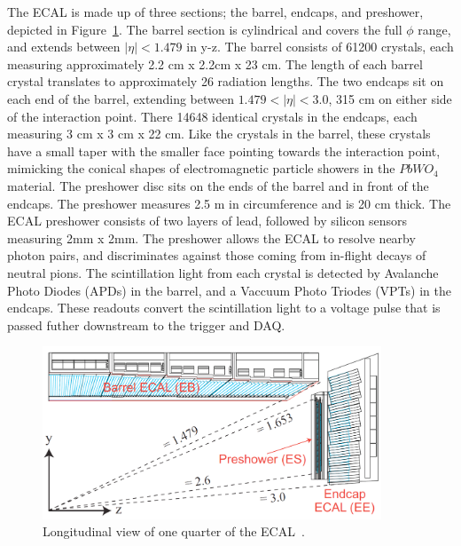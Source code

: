 The ECAL is made up of three sections; the barrel, endcaps, and preshower, depicted in Figure~\ref{fig:cms_ecal}. The barrel section is cylindrical and covers the full $\phi$
range, and extends between $|\eta| < 1.479$ in y-z. The barrel consists of 61200 crystals, each measuring approximately 2.2 cm x 2.2cm x 23 cm. The length of each barrel
crystal translates to approximately 26 radiation lengths. The two endcaps sit on each end of the barrel, extending between $1.479 < |\eta|< 3.0$, 315 cm on either side of
the interaction point. There 14648 identical crystals in the endcaps, each measuring 3 cm x 3 cm x 22 cm. Like the crystals in the barrel, these crystals have a small taper
with the smaller face pointing towards the interaction point, mimicking the conical shapes of electromagnetic particle showers in the $PbWO_{4}$ material.
The preshower disc sits on the ends of the barrel and in front of the endcaps. The preshower measures 2.5 m in circumference and is 20 cm thick. The ECAL preshower consists of two layers
of lead, followed by silicon sensors measuring 2mm x 2mm. The preshower allows the ECAL to resolve nearby photon pairs, and discriminates against those coming from in-flight decays
of neutral pions. The scintillation light from each crystal is detected by Avalanche Photo Diodes (APDs) in the barrel, and a Vaccuum Photo Triodes (VPTs) in the endcaps.
These readouts convert the scintillation light to a voltage pulse that is passed futher downstream to the trigger and DAQ. 

\begin{figure}[hbtp]
 \begin{center}
   \includegraphics[width=0.9\textwidth]{ch3_figs/ecal_rapidity.pdf}
   \caption[Longitudinal view of the CMS ECAL]{Longitudinal view of one quarter of the ECAL~\cite{cms_bluebook}.}
   \label{fig:cms_ecal}
 \end{center}
\end{figure}

